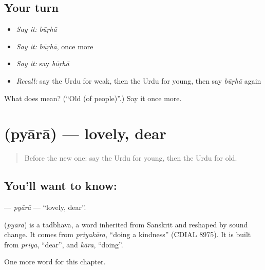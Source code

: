 \subsection*{Your turn}
\begin{itemize}
\raggedright
  \item \emph{Say it:} \emph{būṛhā}
  \item \emph{Say it:} \emph{būṛhā}, once more
  \item \emph{Say it:} say \emph{būṛhā}
  \item \emph{Recall:} say the Urdu for weak, then the Urdu for young, then say \emph{būṛhā} again
\end{itemize}

\begin{tcolorbox}[breakable,colback=teal!4,colframe=teal!35!black,title={Before you move on}]
What does  mean? (\textquotedblleft{}Old (of people)\textquotedblright{}.) Say it once more.
\end{tcolorbox}
\section[\texorpdfstring{\ur{پیارا} (pyārā)}{پیارا (pyārā)}]{ (pyārā) — lovely, dear}

\label{lesson:UR-C133-pyara}



\begin{quote}
Before the new one: say the Urdu for young, then the Urdu for old.
\end{quote}

\subsection*{You'll want to know: }
\textbf{} — \emph{pyārā} — \textquotedblleft{}lovely, dear\textquotedblright{}.

\begin{cousinweb}
\textbf{} (\emph{pyārā}) is a tadbhava, a word inherited from Sanskrit and reshaped by sound change. It comes from \emph{priyakāra}, \textquotedblleft{}doing a kindness\textquotedblright{} (CDIAL 8975). It is built from \emph{priya}, \textquotedblleft{}dear\textquotedblright{}, and \emph{kāra}, \textquotedblleft{}doing\textquotedblright{}.
\end{cousinweb}

\begin{grammarlens}[title={What you've built}]
One more word for this chapter.
\end{grammarlens}

